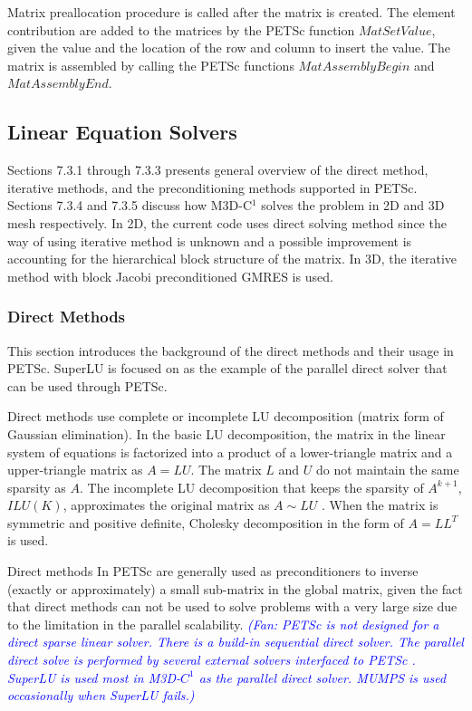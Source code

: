 \documentclass[11pt]{article}  %
\begin{document}
Matrix preallocation procedure is called after the matrix is created. The element contribution are added to the matrices by the PETSc function $MatSetValue$, given the value and the location of the row and column to insert the value.  The matrix is assembled by calling the PETSc functions $MatAssemblyBegin$ and $MatAssemblyEnd$.


\subsection{Linear Equation Solvers} \label{sec:linsolver}
Sections 7.3.1 through 7.3.3 presents general overview of the direct method, iterative methods, and the preconditioning methods supported in PETSc. Sections 7.3.4 and 7.3.5 discuss how M3D-C$^1$ solves the problem in 2D and 3D mesh respectively. In 2D, the current code uses direct solving method since the way of using iterative method is unknown and a possible improvement is accounting for the hierarchical block structure of the matrix. In 3D, the iterative method with block Jacobi preconditioned GMRES is used.

\subsubsection{Direct Methods}
This section introduces the background of the direct methods and their usage in PETSc. SuperLU is focused on as the example of the parallel direct solver that can be used through PETSc.

Direct methods use complete or incomplete LU decomposition  (matrix form of Gaussian elimination). In the basic LU decomposition, the matrix in the linear system of equations is factorized into a product of a lower-triangle matrix and a upper-triangle matrix as $A=LU$. The matrix $L$ and $U$ do not maintain the same sparsity as $A$. The incomplete LU decomposition that keeps the sparsity of $A^{k+1}$, $ILU(K)$,  approximates the  original matrix as $A \sim LU$ \cite{saad2003iterative}. When the matrix is symmetric and positive definite,  Cholesky decomposition in the form of $A=LL^T$ is used.

Direct methods In PETSc are generally used as preconditioners to inverse (exactly or approximately) a small sub-matrix in the global matrix, given the fact that direct methods can not be used to solve problems with a  very large size due to the limitation in the parallel scalability.  \textit{\textcolor{blue}{(Fan: PETSc is not designed for a direct sparse linear solver.  There is a build-in   sequential direct solver.  The parallel direct solve is performed by several external solvers interfaced to PETSc \cite{petsc-ug}.  SuperLU is used most  in M3D-$C^1$ as the parallel direct solver. MUMPS \cite{amestoy2000multifrontal} is used occasionally when SuperLU fails.)}}
\end{document}
